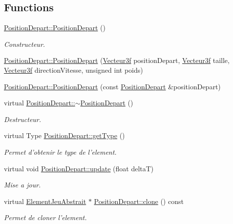 \subsection*{Functions}
\begin{DoxyCompactItemize}
\item 
\hyperlink{group___i_n_f2990-04_ga2cd5d23fdefd5a5db303a8c7e2af9c3c}{Position\-Depart\-::\-Position\-Depart} ()
\begin{DoxyCompactList}\small\item\em Constructeur. \end{DoxyCompactList}\item 
\hyperlink{group___i_n_f2990-04_ga48b038debe01d96507a78be1940891f8}{Position\-Depart\-::\-Position\-Depart} (\hyperlink{group__utilitaire_ga6b2956069f76c7e27df4f79f87e5a48c}{Vecteur3f} position\-Depart, \hyperlink{group__utilitaire_ga6b2956069f76c7e27df4f79f87e5a48c}{Vecteur3f} taille, \hyperlink{group__utilitaire_ga6b2956069f76c7e27df4f79f87e5a48c}{Vecteur3f} direction\-Vitesse, unsigned int poids)
\item 
\hyperlink{group___i_n_f2990-04_ga407a4f493c341f2b9ce6f05d575676aa}{Position\-Depart\-::\-Position\-Depart} (const \hyperlink{class_position_depart}{Position\-Depart} \&position\-Depart)
\item 
virtual \hyperlink{group___i_n_f2990-04_ga7223f64532a213cd4faf6e29aa5c5a30}{Position\-Depart\-::$\sim$\-Position\-Depart} ()
\begin{DoxyCompactList}\small\item\em Destructeur. \end{DoxyCompactList}\item 
virtual Type \hyperlink{group___i_n_f2990-04_gae4b1d64b04abfd849ef302e41c6fc6d1}{Position\-Depart\-::get\-Type} ()
\begin{DoxyCompactList}\small\item\em Permet d'obtenir le type de l'element. \end{DoxyCompactList}\item 
virtual void \hyperlink{group___i_n_f2990-04_gac089935dcf561edb43c8a402e6f6ace5}{Position\-Depart\-::update} (float delta\-T)
\begin{DoxyCompactList}\small\item\em Mise a jour. \end{DoxyCompactList}\item 
\hypertarget{group___i_n_f2990-04_ga8d1a454a58e20a9dda3d393d2ed02271}{virtual \hyperlink{class_element_jeu_abstrait}{Element\-Jeu\-Abstrait} $\ast$ \hyperlink{group___i_n_f2990-04_ga8d1a454a58e20a9dda3d393d2ed02271}{Position\-Depart\-::clone} () const }\label{group___i_n_f2990-04_ga8d1a454a58e20a9dda3d393d2ed02271}

\begin{DoxyCompactList}\small\item\em Permet de cloner l'element. \end{DoxyCompactList}\end{DoxyCompactItemize}


